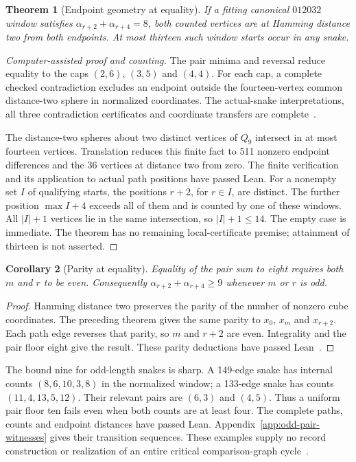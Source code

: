 \documentclass[11pt,a4paper]{article}
\newtheorem{theorem}{Theorem}[section]
\newtheorem{corollary}[theorem]{Corollary}
\theoremstyle{definition}
\theoremstyle{remark}
\newcommand{\Q}{Q}
\begin{document}
\begin{theorem}[Endpoint geometry at equality]\label{thm:pair-eight-endpoints}\label{prop:pair-equality-occurrences}
If a fitting canonical $012032$ window satisfies
$\alpha_{r+2}+\alpha_{r+4}=8$, both counted vertices are at Hamming distance
two from both endpoints. At most thirteen such window starts occur in any snake.
\end{theorem}
\begin{proof}[Computer-assisted proof and counting]
The pair minima and reversal reduce equality to the caps $(2,6)$, $(3,5)$
and $(4,4)$. For each cap, a complete checked contradiction excludes an
endpoint outside the fourteen-vertex common distance-two sphere in normalized
coordinates. The actual-snake interpretations, all three contradiction
certificates and coordinate transfers are complete~\cite{endpointcompletionarchive}.

The distance-two spheres about two distinct vertices of $\Q_9$ intersect
in at most fourteen vertices. Translation reduces this finite fact to
511 nonzero endpoint differences and the 36 vertices at distance two from
zero. The finite verification and its application to actual path positions
have passed Lean. For a nonempty set $I$ of qualifying starts, the positions
$r+2$, for $r\in I$, are distinct. The further position $\max I+4$ exceeds
all of them and is counted by one of these windows. All $|I|+1$ vertices
lie in the same intersection, so $|I|+1\le14$. The empty case is immediate.
The theorem has no remaining local-certificate premise; attainment of thirteen
is not asserted.
\end{proof}

\begin{corollary}[Parity at equality]\label{cor:pair-nine-parity}
Equality of the pair sum to eight requires both $m$ and $r$ to be even.
Consequently $\alpha_{r+2}+\alpha_{r+4}\ge9$ whenever $m$ or $r$ is odd.
\end{corollary}
\begin{proof}
Hamming distance two preserves the parity of the number of nonzero cube
coordinates. The preceding theorem gives the same parity to $x_0$, $x_m$
and $x_{r+2}$. Each path edge reverses that parity, so $m$ and $r+2$ are
even. Integrality and the pair floor eight give the result. These parity
deductions have passed Lean~\cite{endpointcompletionarchive}.
\end{proof}

The bound nine for odd-length snakes is sharp. A 149-edge snake has internal
counts $(8,6,10,3,8)$ in the normalized window; a 133-edge snake has counts
$(11,4,13,5,12)$. Their relevant pairs are $(6,3)$ and $(4,5)$. Thus a
uniform pair floor ten fails even when both counts are at least four.
The complete paths, counts and endpoint distances have passed Lean.
Appendix~\ref{app:odd-pair-witnesses} gives their transition sequences.
These examples supply no record construction or realization of an entire
critical comparison-graph cycle~\cite{oddwitnessarchive}.
\end{document}

